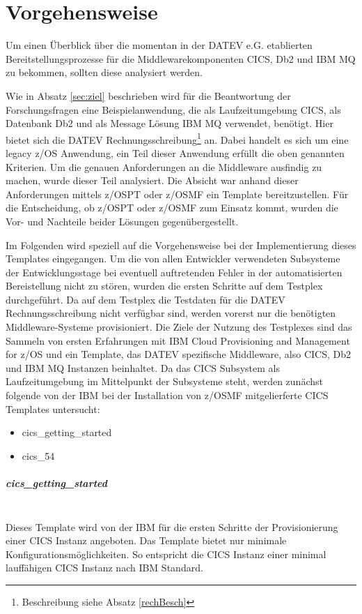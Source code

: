 \chapter{Vorgehensweise}\label{ch:vorgehensweise}
Um einen Überblick über die momentan in der DATEV e.G. etablierten Bereitstellungsprozesse für die Middlewarekomponenten CICS, Db2 und IBM MQ zu bekommen, sollten diese analysiert werden.

Wie in Absatz \ref{sec:ziel} beschrieben wird für die Beantwortung der Forschungsfragen eine Beispielanwendung, die als Laufzeitumgebung CICS, als Datenbank Db2 und als Message Lösung IBM MQ verwendet, benötigt.
Hier bietet sich die \glqq DATEV Rechnungsschreibung\grqq{}\footnote{Beschreibung siehe Absatz \ref{rechBesch}} an.
Dabei handelt es sich um eine legacy z/OS Anwendung, ein Teil dieser Anwendung erfüllt die oben genannten Kriterien.
Um die genauen Anforderungen an die Middleware ausfindig zu machen, wurde dieser Teil analysiert.
Die Absicht war anhand dieser Anforderungen mittels z/OSPT oder z/OSMF ein Template bereitzustellen.
Für die Entscheidung, ob z/OSPT oder z/OSMF zum Einsatz kommt, wurden die Vor- und Nachteile beider Lösungen gegenübergestellt.

Im Folgenden wird speziell auf die Vorgehensweise bei der Implementierung dieses Templates eingegangen.
Um die von allen Entwickler verwendeten Subsysteme der Entwicklungsstage bei eventuell auftretenden Fehler in der automatisierten Bereistellung nicht zu stören, wurden die ersten Schritte auf dem Testplex durchgeführt.
Da auf dem Testplex die Testdaten für die DATEV Rechnungsschreibung nicht verfügbar sind, werden vorerst nur die benötigten Middleware-Systeme provisioniert.
Die Ziele der Nutzung des Testplexes sind das Sammeln von ersten Erfahrungen mit \glqq IBM Cloud Provisioning and Management for z/OS\grqq{} und ein Template, das DATEV spezifische Middleware, also CICS, Db2 und IBM MQ Instanzen beinhaltet.
Da das CICS Subsystem als Laufzeitumgebung im Mittelpunkt der Subsysteme steht, werden zunächst folgende von der IBM bei der Installation von z/OSMF mitgelierferte CICS Templates untersucht:
\begin{itemize}
\item \glqq cics\_getting\_started\grqq
\item \glqq cics\_54\grqq
\end{itemize}

\paragraph{\glqq cics\_getting\_started\grqq}~\\
Dieses Template wird von der IBM für die ersten Schritte der Provisionierung einer CICS Instanz angeboten.
Das Template bietet nur minimale Konfigurationsmöglichkeiten.
So entspricht die CICS Instanz einer minimal lauffähigen CICS Instanz nach IBM Standard.

